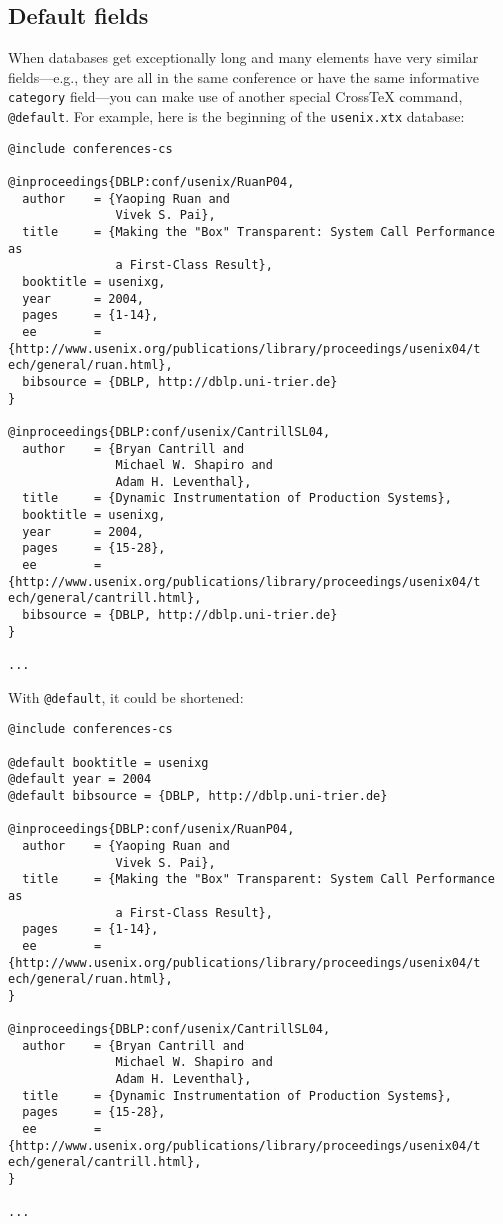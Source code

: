 \documentclass{article}
\newcommand{\XTX}{Cross\TeX}
\begin{document}
\subsection{Default fields}

When databases get exceptionally long and many elements have very
similar fields---e.g., they are all in the same conference or have the
same informative \texttt{category} field---you can make use of another
special \XTX{} command, \texttt{@default}. For example, here is the
beginning of the \texttt{usenix.xtx} database:

\begin{small}\begin{verbatim}
@include conferences-cs

@inproceedings{DBLP:conf/usenix/RuanP04,
  author    = {Yaoping Ruan and
               Vivek S. Pai},
  title     = {Making the "Box" Transparent: System Call Performance as
               a First-Class Result},
  booktitle = usenixg,
  year      = 2004,
  pages     = {1-14},
  ee        = {http://www.usenix.org/publications/library/proceedings/usenix04/t
ech/general/ruan.html},
  bibsource = {DBLP, http://dblp.uni-trier.de}
}

@inproceedings{DBLP:conf/usenix/CantrillSL04,
  author    = {Bryan Cantrill and
               Michael W. Shapiro and
               Adam H. Leventhal},
  title     = {Dynamic Instrumentation of Production Systems},
  booktitle = usenixg,
  year      = 2004,
  pages     = {15-28},
  ee        = {http://www.usenix.org/publications/library/proceedings/usenix04/t
ech/general/cantrill.html},
  bibsource = {DBLP, http://dblp.uni-trier.de}
}

...
\end{verbatim}\end{small}

With \texttt{@default}, it could be shortened:

\begin{small}\begin{verbatim}
@include conferences-cs

@default booktitle = usenixg
@default year = 2004
@default bibsource = {DBLP, http://dblp.uni-trier.de}

@inproceedings{DBLP:conf/usenix/RuanP04,
  author    = {Yaoping Ruan and
               Vivek S. Pai},
  title     = {Making the "Box" Transparent: System Call Performance as
               a First-Class Result},
  pages     = {1-14},
  ee        = {http://www.usenix.org/publications/library/proceedings/usenix04/t
ech/general/ruan.html},
}

@inproceedings{DBLP:conf/usenix/CantrillSL04,
  author    = {Bryan Cantrill and
               Michael W. Shapiro and
               Adam H. Leventhal},
  title     = {Dynamic Instrumentation of Production Systems},
  pages     = {15-28},
  ee        = {http://www.usenix.org/publications/library/proceedings/usenix04/t
ech/general/cantrill.html},
}

...
\end{verbatim}\end{small}
\end{document}
